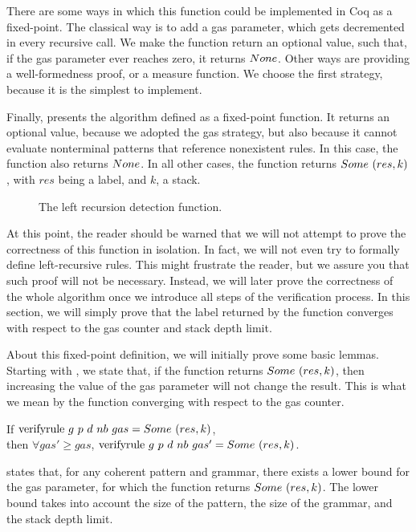 There are some ways in which this function
could be implemented in Coq as a fixed-point.
The classical way is to add a gas parameter,
which gets decremented in every recursive call.
We make the function return an optional value,
such that, if the gas parameter ever reaches zero,
it returns $None$.
Other ways are providing a well-formedness proof,
or a measure function.
We choose the first strategy,
because it is the simplest to implement.

Finally,
 presents the algorithm
defined as a fixed-point function.
It returns an optional value,
because we adopted the gas strategy,
but also because it cannot evaluate
nonterminal patterns that
reference nonexistent rules.
In this case,
the function also returns $None$.
In all other cases,
the function returns $Some\ (res, k)$,
with $res$ being a label, and $k$, a stack.
\begin{figure}
    \centering
    
    \caption{The left recursion detection function.}
    \label{fig:vr-function}
\end{figure}

At this point,
the reader should be warned that
we will not attempt to prove the correctness
of this function in isolation.
In fact, we will not even try to formally
define left-recursive rules.
This might frustrate the reader,
but we assure you that such proof will not be necessary.
Instead,
we will later prove the correctness of the whole algorithm
once we introduce all steps of the verification process.
In this section,
we will simply prove
that the label returned by the function
converges with respect to the gas counter and stack depth limit.

About this fixed-point definition,
we will initially prove some basic lemmas.
Starting with ,
we state that, if the function returns $Some\ (res, k)$,
then increasing the value of the gas parameter
will not change the result.
This is what we mean by
the function converging
with respect to the gas counter.

\begin{lemma}%
    If $\text{verifyrule}{}\ g\ p\ d\ nb\ gas = Some\ (res, k)$, \\
    then $\forall gas' \ge gas$,
    $\text{verifyrule}{}\ g\ p\ d\ nb\ gas' = Some\ (res, k)$.
    \label{lemma:vr-gas-convergence}
\end{lemma}

 states that,
for any coherent pattern and grammar,
there exists a lower bound for the gas parameter,
for which the function returns $Some\ (res, k)$.
The lower bound
takes into account
the size of the pattern,
the size of the grammar,
and the stack depth limit.

